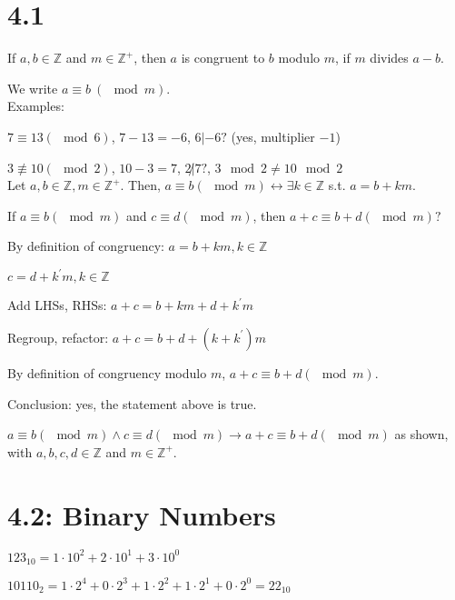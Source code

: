 \documentclass{exam}
\begin{document}
	
    \section{4.1}
    
    If $a, b \in \mathbb Z$ and $m \in \mathbb Z^+$, then $a$ is congruent to $b$ modulo $m$, if $m$ divides $a-b$.
    
    We write $a \equiv b\ (\mod m)$.\\
    
    Examples:
    
    $7 \equiv 13 (\mod 6)$, $7 - 13 = -6$, $6 | -6 ?$ (yes, multiplier $-1$)
    
    $3 \not\equiv 10 (\mod 2)$, $10 - 3 = 7$, $2 \not| 7 ?$, $3 \mod 2 \neq 10 \mod 2$\\
    
    Let $a,b \in \mathbb Z, m \in \mathbb Z^+$. Then, $a \equiv b (\mod m) \leftrightarrow \exists k \in \mathbb Z$ s.t. $a = b + km$.
    
    If $a \equiv b (\mod m)$ and $c \equiv d (\mod m)$, then $a + c \equiv b + d (\mod m) ?$
    
    By definition of congruency: $a = b + km, k \in \mathbb Z$
    
    $c = d + k^{'} m, k \in \mathbb Z$
    
    Add LHSs, RHSs: $a+c = b + km + d + k^{'} m$
    
    Regroup, refactor: $a + c = b + d + (k + k^{'})m$
    
    By definition of congruency modulo $m$, $a + c \equiv b + d (\mod m)$.
    
    Conclusion: yes, the statement above is true. 
    
    $a \equiv b (\mod m) \wedge c \equiv d (\mod m) \rightarrow a + c \equiv b + d (\mod m)$ as shown, with $a,b,c,d \in \mathbb Z$ and $m \in \mathbb Z^+$.
    
    \section{4.2: Binary Numbers}
    
    $123_{10} = 1 \cdot 10^2 + 2 \cdot 10^1 + 3 \cdot 10^0$
    
    $10110_2 = 1 \cdot 2^4 + 0 \cdot 2^3 + 1 \cdot 2^2 + 1 \cdot 2^1 + 0 \cdot 2^0 = 22_{10}$
    
\end{document}
